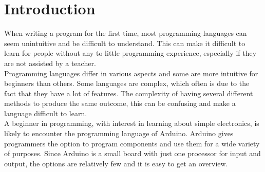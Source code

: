 \section{Introduction}
When writing a program for the first time, most programming languages can seem unintuitive and be difficult to understand. This can make it difficult to learn for people without any to little programming experience, especially if they are not assisted by a teacher.\\
Programming languages differ in various aspects and some are more intuitive for beginners than others. Some languages are complex, which often is due to the fact that they have a lot of features. The complexity of having several different methods to produce the same outcome, this can be confusing and make a language difficult to learn. \\
A beginner in programming, with interest in learning about simple electronics, is likely to encounter the programming language of Arduino. Arduino gives programmers the option to program components and use them for a wide variety of purposes. Since Arduino is a small board with just one processor for input and output, the options are relatively few and it is easy to get an overview. \\